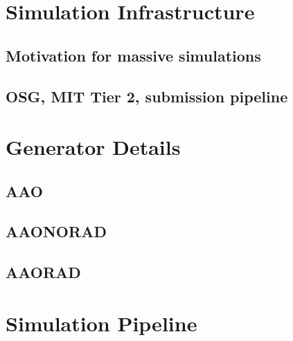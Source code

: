 \section{Simulation Infrastructure}
    \subsection{Motivation for massive simulations}
    \subsection{OSG, MIT Tier 2, submission pipeline}

\section{Generator Details}
    \subsection{AAO}
        \subsection{AAONORAD}
        \subsection{AAORAD}

\section{Simulation Pipeline}
    